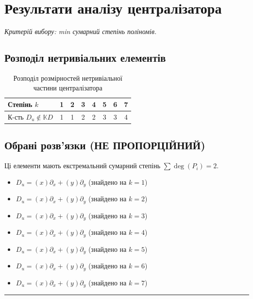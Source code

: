\section*{Результати аналізу централізатора}
\noindent\textit{Критерій вибору: min сумарний степінь поліномів.}\\
\subsection*{Розподіл нетривіальних елементів}
\begin{table}[h!]
\centering
\begin{tabular}{|l|c|c|c|c|c|c|c|}
\hline
Степінь $ k $ & 1 & 2 & 3 & 4 & 5 & 6 & 7 \\ \hline
К-сть $ D_u \notin \mathbb{K}D $ & 1 & 1 & 2 & 2 & 3 & 3 & 4 \\ \hline
\end{tabular}
\caption{Розподіл розмірностей нетривіальної частини централізатора}
\end{table}

\subsection*{Обрані розв'язки (НЕ ПРОПОРЦІЙНИЙ)}
Ці елементи мають екстремальний сумарний степінь $\sum \deg(P_i) = 2$.\\
\begin{itemize}
  \item $ D_{u} = ( x ) \partial_x + ( y ) \partial_y $ \quad (знайдено на $ k = 1 $)
  \item $ D_{u} = ( x ) \partial_x + ( y ) \partial_y $ \quad (знайдено на $ k = 2 $)
  \item $ D_{u} = ( x ) \partial_x + ( y ) \partial_y $ \quad (знайдено на $ k = 3 $)
  \item $ D_{u} = ( x ) \partial_x + ( y ) \partial_y $ \quad (знайдено на $ k = 4 $)
  \item $ D_{u} = ( x ) \partial_x + ( y ) \partial_y $ \quad (знайдено на $ k = 5 $)
  \item $ D_{u} = ( x ) \partial_x + ( y ) \partial_y $ \quad (знайдено на $ k = 6 $)
  \item $ D_{u} = ( x ) \partial_x + ( y ) \partial_y $ \quad (знайдено на $ k = 7 $)
\end{itemize}
\vfill\hrule
